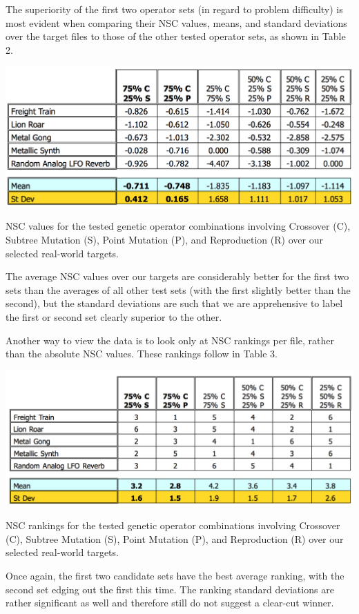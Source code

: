 \documentclass[12pt]{report} 	%
\numberwithin{figure}{chapter}
\numberwithin{table}{chapter}
\numberwithin{equation}{chapter}
\begin{document}
\begin{flushleft}
The superiority of the first two operator sets (in regard to problem difficulty) is most evident when comparing their NSC values, means, and standard deviations over the target files to those of the other tested operator sets, as shown in Table 2.
\begin{table}[h!]
\vspace{24pt}
\begin{center}
\includegraphics[scale=0.6,width=\linewidth]{GOPS_Table1}
\caption[NSC values for tested genetic operator combinations]{NSC values for the tested genetic operator combinations involving Crossover (C), Subtree Mutation (S), Point Mutation (P), and Reproduction (R) over our selected real-world targets.}
\end{center}
\vspace{6pt}
\end{table}

The average NSC values over our targets are considerably better for the first two sets than the averages of all other test sets (with the first slightly better than the second), but the standard deviations are such that we are apprehensive to label the first or second set clearly superior to the other.

Another way to view the data is to look only at NSC rankings per file, rather than the absolute NSC values. These rankings follow in Table 3.
\begin{table}[h!]
\begin{center}
\includegraphics[scale=0.6,width=\linewidth]{GOPS_Table2}
\caption[NSC rankings for tested genetic operator combinations]{NSC rankings for the tested genetic operator combinations involving Crossover (C), Subtree Mutation (S), Point Mutation (P), and Reproduction (R) over our selected real-world targets.}
\end{center}
\vspace{6pt}
\end{table}
Once again, the first two candidate sets have the best average ranking, with the second set edging out the first this time. The ranking standard deviations are rather significant as well and therefore still do not suggest a clear-cut winner. 


\end{flushleft}
\end{document}
